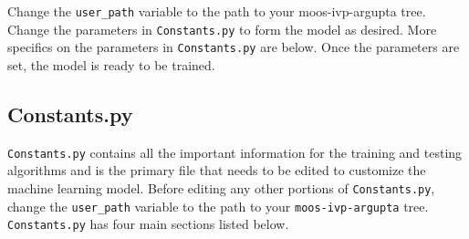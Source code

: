 \documentclass[onecolumn,letterpaper,11pt]{article}
\begin{document}
Change the \texttt{user\_path} variable to the path to your moos-ivp-argupta tree. Change the parameters in \texttt{Constants.py} to form the model as desired. More specifics on the parameters in \texttt{Constants.py} are below. Once the parameters are set, the model is ready to be trained. 

\subsection{Constants.py}
\texttt{Constants.py} contains all the important information for the training and testing algorithms and is the primary file that needs to be edited to customize the machine learning model. Before editing any other portions of \texttt{Constants.py}, change the \texttt{user\_path} variable to the path to your \texttt{moos-ivp-argupta} tree. \texttt{Constants.py} has four main sections listed below.
\end{document}

